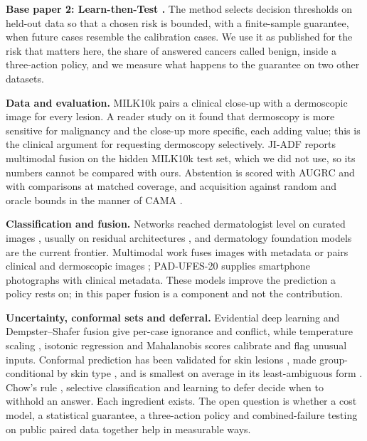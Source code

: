 \documentclass[conference]{IEEEtran}
\begin{document}
\textbf{Base paper 2: Learn-then-Test \cite{r3}.} The method selects decision thresholds on held-out data so that a chosen risk is bounded, with a finite-sample guarantee, when future cases resemble the calibration cases. We use it as published for the risk that matters here, the share of answered cancers called benign, inside a three-action policy, and we measure what happens to the guarantee on two other datasets.

\textbf{Data and evaluation.} MILK10k \cite{r4} pairs a clinical close-up with a dermoscopic image for every lesion. A reader study on it \cite{r5} found that dermoscopy is more sensitive for malignancy and the close-up more specific, each adding value; this is the clinical argument for requesting dermoscopy selectively. JI-ADF \cite{r6} reports multimodal fusion on the hidden MILK10k test set, which we did not use, so its numbers cannot be compared with ours. Abstention is scored with AUGRC \cite{r7} and with comparisons at matched coverage, and acquisition against random and oracle bounds in the manner of CAMA \cite{r8}.

\textbf{Classification and fusion.} Networks reached dermatologist level on curated images \cite{r1}, usually on residual architectures \cite{r9}, and dermatology foundation models \cite{r10} are the current frontier. Multimodal work fuses images with metadata \cite{r11} or pairs clinical and dermoscopic images \cite{r12}; PAD-UFES-20 \cite{r13} supplies smartphone photographs with clinical metadata. These models improve the prediction a policy rests on; in this paper fusion is a component and not the contribution.

\textbf{Uncertainty, conformal sets and deferral.} Evidential deep learning \cite{r14} and Dempster--Shafer fusion \cite{r15,r16} give per-case ignorance and conflict, while temperature scaling \cite{r17}, isotonic regression \cite{r18} and Mahalanobis scores \cite{r19} calibrate and flag unusual inputs. Conformal prediction has been validated for skin lesions \cite{r20}, made group-conditional by skin type \cite{r21}, and is smallest on average in its least-ambiguous form \cite{r22}. Chow's rule \cite{r23}, selective classification \cite{r24} and learning to defer \cite{r25} decide when to withhold an answer. Each ingredient exists. The open question is whether a cost model, a statistical guarantee, a three-action policy and combined-failure testing on public paired data together help in measurable ways.
\end{document}
